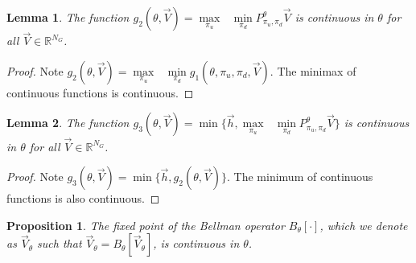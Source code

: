 \documentclass{journal}
\newcommand{\RR}{\mathbb{R}}
\newtheorem{lemma}{Lemma}
\newtheorem{proposition}{Proposition}
\begin{document}
\begin{lemma}
The function $g_2(\theta,\vec{V})= \underset{\pi_u}{\max}\text{ }\underset{ \pi_d}{\min} P^{\theta}_{\pi_u, \pi_d} \vec{V}$ is continuous in $\theta$ for all $\vec{V}\in \RR^{N_G}$.
\end{lemma}

\begin{proof}
Note $g_2(\theta,\vec{V})=\underset{\pi_u}{\max}\text{ }\underset{ \pi_d}{\min}g_1(\theta,\pi_u,\pi_d,\vec{V})$. The minimax of continuous functions is continuous. 
\end{proof}


\begin{lemma}
The function $g_3(\theta,\vec{V})= \min\{\vec{h}, \underset{\pi_u}{\max}\text{ }\underset{ \pi_d}{\min} P^{\theta}_{\pi_u, \pi_d} \vec{V}\}$ is continuous in $\theta$ for all $\vec{V}\in \RR^{N_G}$.
\end{lemma}

\begin{proof}
Note $g_3(\theta,\vec{V})= \min\{\vec{h}, g_2(\theta,\vec{V})\}$. The minimum of continuous functions is also continuous. 
\end{proof}

\begin{proposition}
The fixed point of the Bellman operator $B_{\theta}[\cdot]$, which we denote as $\vec{V}_{\theta}$ such that $\vec{V}_{\theta}=B_{\theta}[\vec{V}_{\theta}]$, is continuous in $\theta$.
\end{proposition}
\end{document}
